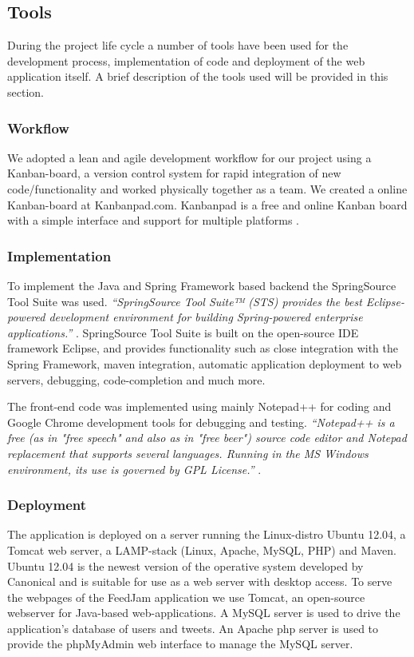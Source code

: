 \subsection{Tools} %
During the project life cycle a number of tools have been used for the development process, implementation of code and deployment of the web application itself. A brief description of the tools used will be provided in this section.


\subsubsection{Workflow}
We adopted a lean and agile development workflow for our project using a Kanban-board, a version control system for rapid integration of new code/functionality and worked physically together as a team. We created a online Kanban-board at Kanbanpad.com. Kanbanpad is a free and online Kanban board with a simple interface and support for multiple platforms \cite{TheHybridGroup2012}.

\subsubsection{Implementation}
To implement the Java and Spring Framework based backend the SpringSource Tool Suite was used. \textit{``SpringSource Tool Suite™ (STS) provides the best Eclipse-powered development environment for building Spring-powered enterprise applications.''} \cite{SpringSource}. SpringSource Tool Suite is built on the open-source IDE framework Eclipse, and provides functionality such as close integration with the Spring Framework, maven integration, automatic application deployment to web servers, debugging, code-completion and much more.

The front-end code was implemented using mainly Notepad++ for coding and Google Chrome development tools for debugging and testing. \textit{``Notepad++ is a free (as in "free speech" and also as in "free beer") source code editor and Notepad replacement that supports several languages. Running in the MS Windows environment, its use is governed by GPL License.''} \cite{Ho2012}.

\subsubsection{Deployment}
The application is deployed on a server running the Linux-distro Ubuntu 12.04, a Tomcat web server, a LAMP-stack (Linux, Apache, MySQL, PHP) and Maven. Ubuntu 12.04 is the newest version of the operative system developed by Canonical and is suitable for use as a web server with desktop access. To serve the webpages of the FeedJam application we use Tomcat, an open-source webserver for Java-based web-applications. A MySQL server is used to drive the application's database of users and tweets. An Apache php server is used to provide the phpMyAdmin web interface to manage the MySQL server.

